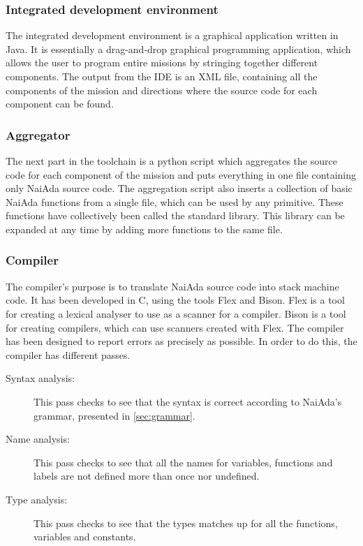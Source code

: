 \subsubsection{Integrated development environment}
The integrated development environment is a graphical application written in Java. It is essentially a drag-and-drop graphical programming application, which allows the user to program entire missions by stringing together different components. The output from the IDE is an XML file, containing all the components of the mission and directions where the source code for each component can be found.

\subsubsection{Aggregator}
The next part in the toolchain is a python script which aggregates the source code for each component of the mission and puts everything in one file containing only NaiAda source code. The aggregation script also inserts a collection of basic NaiAda functions from a single file, which can be used by any primitive. These functions have collectively been called the standard library. This library can be expanded at any time by adding more functions to the same file.

\subsubsection{Compiler}
The compiler's purpose is to translate NaiAda source code into stack machine code. It has been developed in C, using the tools Flex and Bison\cite{web:mcsflex}\cite{web:mcsbison}. Flex is a tool for creating a lexical analyser to use as a scanner for a compiler. Bison is a tool for creating compilers, which can use scanners created with Flex. The compiler has been designed to report errors as precisely as possible. In order to do this, the compiler has different passes.

\begin{description}
\item[Syntax analysis:] This pass checks to see that the syntax is correct according to NaiAda's grammar, presented in \cref{sec:grammar}.
\item[Name analysis:] This pass checks to see that all the names for variables, functions and labels are not defined more than once nor undefined.
\item[Type analysis:] This pass checks to see that the types matches up for all the functions, variables and constants.
\end{description}

